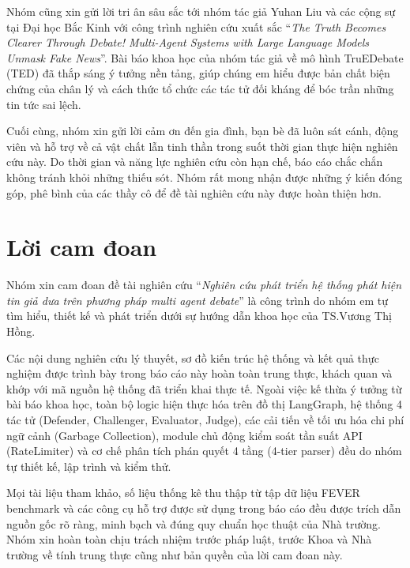 \documentclass[12pt,a4paper]{report}
\begin{document}
Nhóm cũng xin gửi lời tri ân sâu sắc tới nhóm tác giả Yuhan Liu và các cộng sự tại Đại học Bắc Kinh với công trình nghiên cứu xuất sắc ``\textit{The Truth Becomes Clearer Through Debate! Multi-Agent Systems with Large Language Models Unmask Fake News}''. Bài báo khoa học của nhóm tác giả về mô hình TruEDebate (TED) đã thắp sáng ý tưởng nền tảng, giúp chúng em hiểu được bản chất biện chứng của chân lý và cách thức tổ chức các tác tử đối kháng để bóc trần những tin tức sai lệch. 

Cuối cùng, nhóm xin gửi lời cảm ơn đến gia đình, bạn bè đã luôn sát cánh, động viên và hỗ trợ về cả vật chất lẫn tinh thần trong suốt thời gian thực hiện nghiên cứu này. Do thời gian và năng lực nghiên cứu còn hạn chế, báo cáo chắc chắn không tránh khỏi những thiếu sót. Nhóm rất mong nhận được những ý kiến đóng góp, phê bình của các thầy cô để đề tài nghiên cứu này được hoàn thiện hơn.

\newpage

\chapter*{Lời cam đoan}
\setcounter{page}{3}

Nhóm xin cam đoan đề tài nghiên cứu ``\textit{Nghiên cứu phát triển hệ thống phát hiện tin giả dưa trên phương pháp multi agent debate}'' là công trình do nhóm em tự tìm hiểu, thiết kế và phát triển dưới sự hướng dẫn khoa học của TS.Vương Thị Hồng. 

Các nội dung nghiên cứu lý thuyết, sơ đồ kiến trúc hệ thống và kết quả thực nghiệm được trình bày trong báo cáo này hoàn toàn trung thực, khách quan và khớp với mã nguồn hệ thống đã triển khai thực tế. Ngoài việc kế thừa ý tưởng từ bài báo khoa học, toàn bộ logic hiện thực hóa trên đồ thị LangGraph, hệ thống 4 tác tử (Defender, Challenger, Evaluator, Judge), các cải tiến về tối ưu hóa chi phí ngữ cảnh (Garbage Collection), module chủ động kiểm soát tần suất API (RateLimiter) và cơ chế phân tích phán quyết 4 tầng (4-tier parser) đều do nhóm tự thiết kế, lập trình và kiểm thử.

Mọi tài liệu tham khảo, số liệu thống kê thu thập từ tập dữ liệu FEVER benchmark và các công cụ hỗ trợ được sử dụng trong báo cáo đều được trích dẫn nguồn gốc rõ ràng, minh bạch và đúng quy chuẩn học thuật của Nhà trường. Nhóm xin hoàn toàn chịu trách nhiệm trước pháp luật, trước Khoa và Nhà trường về tính trung thực cũng như bản quyền của lời cam đoan này.
\end{document}
